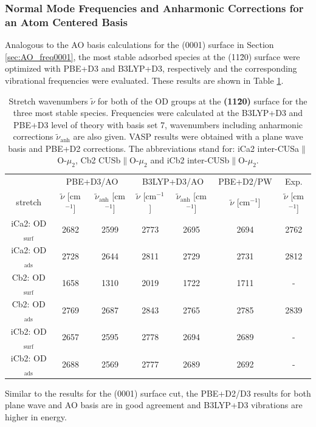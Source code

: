 \documentclass[11pt,DIV=13,BCOR=5mm,a4paper,headinclude]{scrbook}
\renewcommand{\vec}[1]{\underline{#1}}
\begin{document}
\subsubsection{Normal Mode Frequencies and Anharmonic Corrections for an Atom Centered Basis}
Analogous to the AO basis calculations for the (0001) surface in Section \ref{sec:AO_freq0001}, the most stable adsorbed species at the (11\=20) surface were optimized with PBE+D3 and B3LYP+D3, respectively and the corresponding vibrational frequencies were evaluated.
These results are shown in Table \ref{tab:freqs_11-20_crystal}.
\begin{table}[!h]
  \centering
  \caption{Stretch wavenumbers $\tilde{\nu}$ for both of the OD groups at the \textbf{(11\=20)} surface for the three most stable species.
Frequencies were calculated at the B3LYP+D3 and PBE+D3 level of theory with basis set 7, wavenumbers including anharmonic corrections $\tilde{\nu}_\textrm{anh}$ are also given.
VASP results were obtained with a plane wave basis and PBE+D2 corrections.
The abbreviations stand for: iCa2 inter-CUSa$\parallel$O-$\mu_2$, Cb2 CUSb$\parallel$O-$\mu_2$ and iCb2 inter-CUSb$\parallel$O-$\mu_2$.}
  \begin{tabular}{ccc|cc|c|c}
  \toprule
   & \multicolumn{2}{c}{PBE+D3/AO} & \multicolumn{2}{c}{B3LYP+D3/AO} &PBE+D2/PW&Exp.\cite{Heiden11-20_2018}\\
  stretch & $\tilde{\nu}$ [cm$^{-1}$] &$\tilde{\nu}_\textrm{anh}$ [cm$^{-1}$] &$\tilde{\nu}$ [cm$^{-1}$] & $\tilde{\nu}_\textrm{anh}$ [cm$^{-1}$]&$\tilde{\nu}$ [cm$^{-1}$]&$\tilde{\nu}$ [cm$^{-1}$]\\\midrule
  iCa2: OD$_{\textrm{surf}}$ &2682 &2599 &2773 &2695 & 2694&2762\\
  iCa2: OD$_{\textrm{ads}}$  &2728 &2644 &2811 &2729 & 2731&2812\\
  Cb2: OD$_{\textrm{surf}}$  &1658 &1310 &2019 &1722 & 1711&-\\
  Cb2: OD$_{\textrm{ads}}$   &2769 &2687 &2843 &2765 & 2785&2839\\
  iCb2: OD$_{\textrm{surf}}$ &2657 &2595 &2778 &2694 & 2689&-\\
  iCb2: OD$_{\textrm{ads}}$  &2688 &2569 &2777 &2689 & 2692&-\\\bottomrule
  \end{tabular}
  \label{tab:freqs_11-20_crystal}
\end{table}
Similar to the results for the (0001) surface cut, the PBE+D2/D3 results for both plane wave and AO basis are in good agreement and B3LYP+D3 vibrations are higher in energy.
\end{document}
